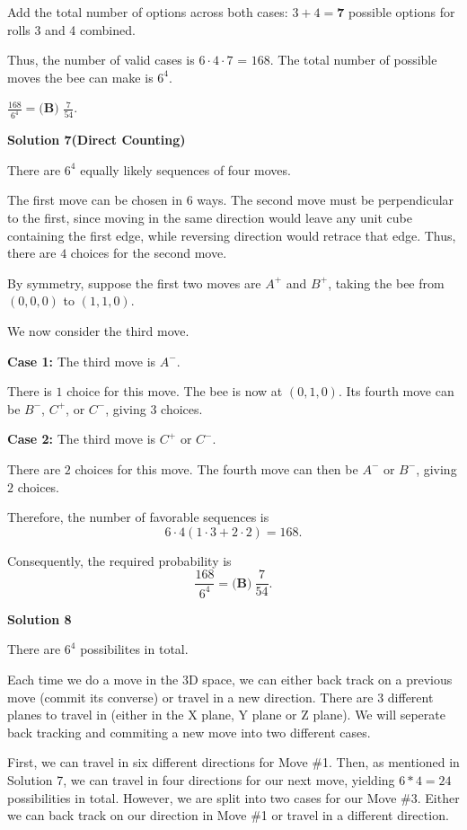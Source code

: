 \begin{enumerate}
 
Add the total number of options across both cases: $3 + 4 = \textbf{7}$ possible options for rolls 3 and 4 combined.

 Thus, the number of valid cases is $6 \cdot 4 \cdot 7$ = $168$. The total number of possible moves the bee can make is $6^4$.

 $\frac{168}{6^4} = \boxed{\textbf{(B) }\frac{7}{54}}$.

 


 



\textbf{Solution 7(Direct Counting)}

There are $6^4$ equally likely sequences of four moves.

 The first move can be chosen in $6$ ways. The second move must be perpendicular to the first, since moving in the same direction would leave any unit cube containing the first edge, while reversing direction would retrace that edge. Thus, there are $4$ choices for the second move.

 By symmetry, suppose the first two moves are $A^+$ and $B^+$, taking the bee from $(0,0,0)$ to $(1,1,0)$.

 We now consider the third move.

 \textbf{Case 1:} The third move is $A^-$.

 There is $1$ choice for this move. The bee is now at $(0,1,0)$. Its fourth move can be $B^-$, $C^+$, or $C^-$, giving $3$ choices.

 \textbf{Case 2:} The third move is $C^+$ or $C^-$.

 There are $2$ choices for this move. The fourth move can then be $A^-$ or $B^-$, giving $2$ choices.

 Therefore, the number of favorable sequences is
 \[6\cdot4(1\cdot3+2\cdot2)=168.\]

 Consequently, the required probability is
 \[\frac{168}{6^4}=\boxed{\textbf{(B)}\ \frac7{54}}.\]




\textbf{Solution 8}

There are $6^4$ possibilites in total.

 Each time we do a move in the 3D space, we can either back track on a previous move (commit its converse) or travel in a new direction. There are 3 different planes to travel in (either in the X plane, Y plane or Z plane). We will seperate back tracking and commiting a new move into two different cases.

 First, we can travel in six different directions for Move \#1. Then, as mentioned in Solution 7, we can travel in four directions for our next move, yielding $6 * 4 = 24$ possibilities in total. However, we are split into two cases for our Move \#3. Either we can back track on our direction in Move \#1 or travel in a different direction. 


\end{enumerate}
